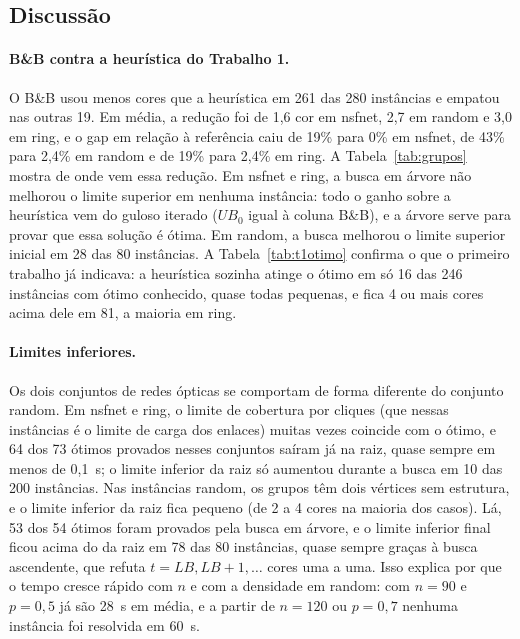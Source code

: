 \documentclass[12pt]{article}
\newcommand{\LB}{\mathit{LB}}
\newcommand{\UB}{\mathit{UB}}
\begin{document}
\subsection{Discussão}

\paragraph{B\&B contra a heurística do Trabalho 1.} O B\&B usou menos cores
que a heurística em 261 das 280 instâncias e empatou nas outras 19. Em média,
a redução foi de 1,6 cor em nsfnet, 2,7 em random e 3,0 em ring, e o gap em
relação à referência caiu de 19\% para 0\% em nsfnet, de 43\% para 2,4\% em
random e de 19\% para 2,4\% em ring. A Tabela~\ref{tab:grupos} mostra de onde
vem essa redução. Em nsfnet e ring, a busca em árvore não melhorou o limite
superior em nenhuma instância: todo o ganho sobre a heurística vem do guloso
iterado ($\UB_0$ igual à coluna B\&B), e a árvore serve para provar que essa
solução é ótima. Em random, a busca melhorou o limite superior inicial em 28
das 80 instâncias. A Tabela~\ref{tab:t1otimo} confirma o que o primeiro
trabalho já indicava: a heurística sozinha atinge o ótimo em só 16 das 246
instâncias com ótimo conhecido, quase todas pequenas, e fica 4 ou mais cores
acima dele em 81, a maioria em ring.

\paragraph{Limites inferiores.} Os dois conjuntos de redes ópticas se
comportam de forma diferente do conjunto random. Em nsfnet e ring, o limite
de cobertura por cliques (que nessas instâncias é o limite de carga dos
enlaces) muitas vezes coincide com o ótimo, e 64 dos 73 ótimos provados
nesses conjuntos saíram já na raiz, quase sempre em menos de 0,1~s; o limite
inferior da raiz só aumentou durante a busca em 10 das 200 instâncias. Nas
instâncias random, os grupos têm dois vértices sem estrutura, e o limite
inferior da raiz fica pequeno (de 2 a 4 cores na maioria dos casos). Lá, 53
dos 54 ótimos foram provados pela busca em árvore, e o limite inferior final
ficou acima do da raiz em 78 das 80 instâncias, quase sempre graças à busca
ascendente, que refuta $t=\LB,\LB+1,\dots$ cores uma a uma. Isso explica por que o tempo cresce rápido com $n$ e com a
densidade em random: com $n=90$ e $p=0{,}5$ já são 28~s em média, e a partir
de $n=120$ ou $p=0{,}7$ nenhuma instância foi resolvida em 60~s.
\end{document}

